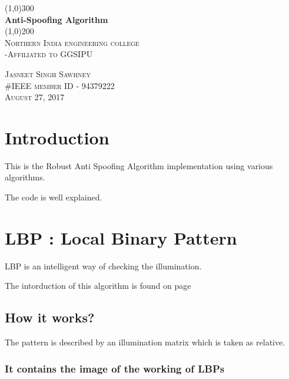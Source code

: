 \documentclass{article}
\begin{document}
\begin{comment}
this is used to comment out lines.
\title{Robust Anti-Spoofing Algorithm}
\author{Innovative Coder}
\date{August 27, 2017}
\maketitle
above written code will print the report in very lame format 
the code written below is improved.
\end{comment}
\begin{titlepage}
	\begin{center}
	\line(1,0){300}\\
	[0.25 in]
	\huge{\bfseries Anti-Spoofing Algorithm}\\
	[2mm]
	\line(1,0){200}\\
	[1.5mm]
	\textsc{\LARGE Northern India engineering college}\\
	[0.75mm]
	\textsc{\Large -Affiliated to GGSIPU}\\
	[12.5cm]
	\end{center}
	
	\begin{flushright}
	\textsc{\large Jasneet Singh Sawhney\\
	\#IEEE member ID - 94379222\\
	August 27, 2017\\}
	\end{flushright}

	
\end{titlepage}
\section{Introduction}\label{sec:intro}
This is the Robust Anti Spoofing Algorithm implementation using various algorithms.

The code is well explained.
\lipsum[1]

\newpage
\section{LBP : Local Binary Pattern}
LBP is an intelligent way of checking the illumination. 

The intorduction of this algorithm is found on page \pageref{sec:intro}
\subsection{How it works?}
The pattern is described by an illumination matrix which is  taken as relative.
\subsubsection{It contains the image of the working of LBPs}
\end{document}
